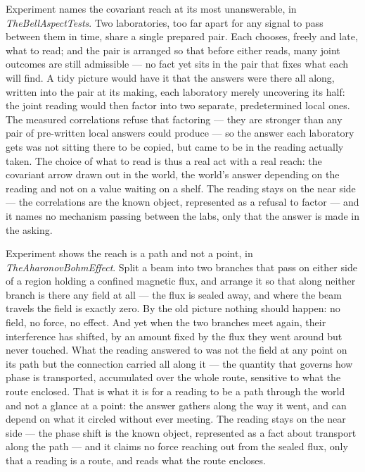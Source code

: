 Experiment names the covariant reach at its most unanswerable, in \emph{TheBellAspectTests}.
Two laboratories, too far apart for any signal to pass between them in time, share a single prepared pair.
Each chooses, freely and late, what to read; and the pair is arranged so that before either reads, many joint outcomes
are still admissible --- no fact yet sits in the pair that fixes what each will find.
A tidy picture would have it that the answers were there all along, written into the pair at its making, each laboratory
merely uncovering its half: the joint reading would then factor into two separate, predetermined local ones.
The measured correlations refuse that factoring --- they are stronger than any pair of pre-written local answers could
produce --- so the answer each laboratory gets was not sitting there to be copied, but came to be in the reading actually
taken.
The choice of what to read is thus a real act with a real reach: the covariant arrow drawn out in the world, the world's
answer depending on the reading and not on a value waiting on a shelf.
The reading stays on the near side --- the correlations are the known object, represented as a refusal to factor --- and
it names no mechanism passing between the labs, only that the answer is made in the asking.

Experiment shows the reach is a path and not a point, in \emph{TheAharonovBohmEffect}.
Split a beam into two branches that pass on either side of a region holding a confined magnetic flux, and arrange it so
that along neither branch is there any field at all --- the flux is sealed away, and where the beam travels the field is
exactly zero.
By the old picture nothing should happen: no field, no force, no effect.
And yet when the two branches meet again, their interference has shifted, by an amount fixed by the flux they went around
but never touched.
What the reading answered to was not the field at any point on its path but the connection carried all along it --- the
quantity that governs how phase is transported, accumulated over the whole route, sensitive to what the route enclosed.
That is what it is for a reading to be a path through the world and not a glance at a point: the answer gathers along the
way it went, and can depend on what it circled without ever meeting.
The reading stays on the near side --- the phase shift is the known object, represented as a fact about transport along
the path --- and it claims no force reaching out from the sealed flux, only that a reading is a route, and reads what the
route encloses.

